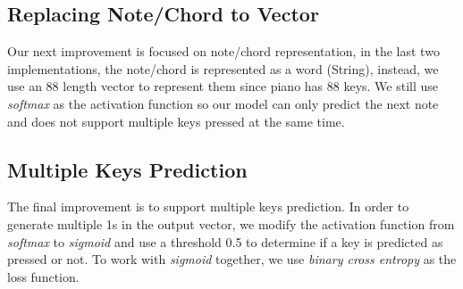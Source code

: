 \documentclass[conference]{IEEEtran}
\begin{document}
\subsection{Replacing Note/Chord to Vector}
Our next improvement is focused on note/chord representation, in the last two implementations, the note/chord is represented as a word (String), instead, we use an 88 length vector to represent them since piano has 88 keys. We still use \textit{softmax} as the activation function so our model can only predict the next note and does not support multiple keys pressed at the same time.

\subsection{Multiple Keys Prediction}
The final improvement is to support multiple keys prediction. In order to generate multiple 1s in the output vector, we modify the activation function from \textit{softmax} to \textit{sigmoid} and use a threshold 0.5 to determine if a key is predicted as pressed or not. To work with \textit{sigmoid} together, we use \textit{binary cross entropy} as the loss function.
\end{document}
